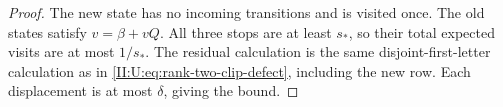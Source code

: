 \begin{proof}
The new state has no incoming transitions and is visited once.
The old states satisfy $v=\beta+vQ$. All three stops are at least
$s_*$, so their total expected visits are at most $1/s_*$.
The residual calculation is the same disjoint-first-letter calculation
as in \eqref{II:U:eq:rank-two-clip-defect}, including the new row.
Each displacement is at most $\delta$, giving the bound.
\end{proof}
